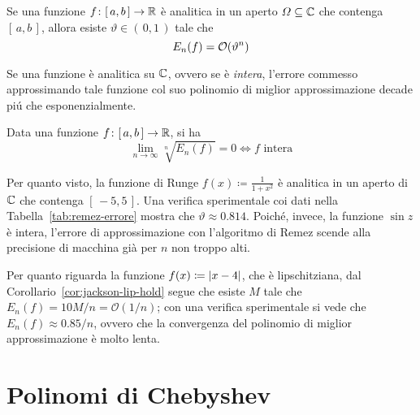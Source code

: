 	\begin{teorema}\label{th:errore-approx-analitica}
		Se una funzione \(f \colon [\, a, b \,] \to \mathbb{R}\) è analitica in un aperto \(\varOmega \subseteq \mathbb{C}\) che contenga \([\, a, b \,]\), allora esiste \(\vartheta \in (\, 0, 1 \,)\) tale che
		\begin{equation}\label{eq:errore-approx-analitica}
			E_n (f) = \mathcal{O} \qty(\vartheta^n)
		\end{equation}
	\end{teorema}

	Se una funzione è analitica su \(\mathbb{C}\), ovvero se è \emph{intera}, l'errore commesso approssimando tale funzione col suo polinomio di miglior approssimazione decade piú che esponenzialmente.
	
	\begin{teorema}[Bernstein]\label{th:bernstein}
		Data una funzione \(f \colon [\, a, b \,] \to \mathbb{R}\), si ha
		\begin{equation}\label{eq:bernstein}
			\lim_{n \to \infty} \sqrt[n]{E_n (f)} = 0 \iff \text{\(f\) intera}
		\end{equation}
	\end{teorema}

	\begin{osservazione}
		Per quanto visto, la funzione di Runge \(f (x) \coloneqq \frac{1}{1 + x^2}\) è analitica in un aperto di \(\mathbb{C}\) che contenga \([\, -5, 5 \,]\). Una verifica sperimentale coi dati nella Tabella~\ref{tab:remez-errore} mostra che \(\vartheta \approx \num{0.814}\). Poiché, invece, la funzione \(\sin z\) è intera, l'errore di approssimazione con l'algoritmo di Remez scende alla precisione di macchina già per \(n\) non troppo alti.
		
		Per quanto riguarda la funzione \(f (x) \coloneqq \abs{x - 4}\), che è lipschitziana, dal Corollario~\ref{cor:jackson-lip-hold} segue che esiste \(M\) tale che \(E_n (f) = 10 M / n = \mathcal{O} (1 / n)\); con una verifica sperimentale si vede che \(E_n (f) \approx \num{0.85} / n\), ovvero che la convergenza del polinomio di miglior approssimazione è molto lenta.
	\end{osservazione}

\section{Polinomi di Chebyshev}
	
